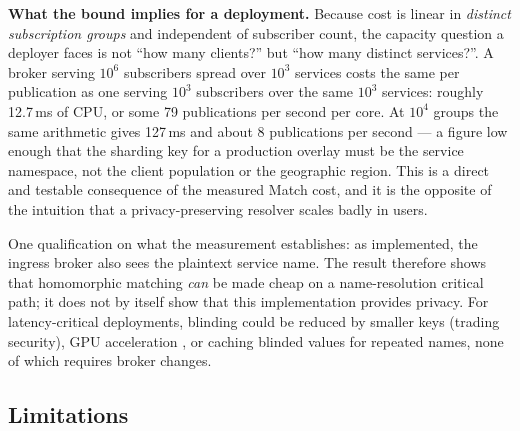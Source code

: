 \documentclass[10pt]{article}
\begin{document}
\textbf{What the bound implies for a deployment.} Because cost is linear in \emph{distinct subscription groups} and independent of subscriber count, the capacity question a deployer faces is not ``how many clients?'' but ``how many distinct services?''. A broker serving $10^6$ subscribers spread over $10^3$ services costs the same per publication as one serving $10^3$ subscribers over the same $10^3$ services: roughly 12.7\,ms of CPU, or some 79 publications per second per core. At $10^4$ groups the same arithmetic gives 127\,ms and about 8 publications per second --- a figure low enough that the sharding key for a production overlay must be the service namespace, not the client population or the geographic region. This is a direct and testable consequence of the measured Match cost, and it is the opposite of the intuition that a privacy-preserving resolver scales badly in users.

One qualification on what the measurement establishes: as implemented, the ingress broker also sees the plaintext service name. The result therefore shows that homomorphic matching \emph{can} be made cheap on a name-resolution critical path; it does not by itself show that this implementation provides privacy. For latency-critical deployments, blinding could be reduced by smaller keys (trading security), GPU acceleration \citep[which reports 9.6M matches per second on an H100]{rio2026dnspplus}, or caching blinded values for repeated names, none of which requires broker changes.

\subsection{Limitations}
\label{sec:limitations}
\end{document}
